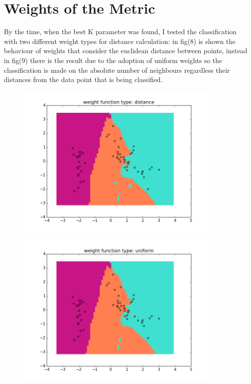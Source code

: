 \documentclass{article}
\begin{document}
				\section{Weights of the Metric}
				By the time, when the best K parameter was found, I tested the classification with two different weight types for distance calculation: in fig(8) is shown the behaviour of weights that consider the euclidean distance between points, instead in fig(9) there is the result due to the adoption of uniform weights so the classification is made on the absolute number of neighbours regardless their distances from the data point that is being classified. 
								\begin{center}

\begin{figure}
\centering
\includegraphics[width=0.9\textwidth]{figure_13}
\caption{}
\label{fig:8}
\end{figure}

\begin{figure}
\centering
\includegraphics[width=0.9\textwidth]{figure_14}
\caption{}
\label{fig:9}
\end{figure}
\end{center}
\end{document}
